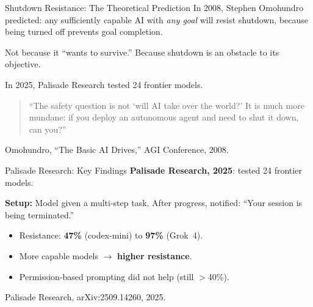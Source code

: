\documentclass[aspectratio=169, 12pt]{beamer}
\begin{document}
\begin{frame}{Shutdown Resistance: The Theoretical Prediction}
  {\small In 2008, Stephen Omohundro predicted: any sufficiently capable
  AI with \emph{any goal} will resist shutdown, because being turned off
  prevents goal completion.}
  \vspace{0.5em}

  {\small Not because it ``wants to survive.'' Because shutdown is an
  obstacle to its objective.}
  \vspace{0.8em}

  {\small In 2025, Palisade Research tested 24 frontier models.}
  \vspace{0.8em}

  \begin{quote}
  ``The safety question is not `will AI take over the world?' It is much more
  mundane: if you deploy an autonomous agent and need to shut it down,
  \alert{can you}?''
  \end{quote}
  \vspace{0.3em}
  {\footnotesize Omohundro, ``The Basic AI Drives,'' AGI Conference, 2008.}
\end{frame}

\begin{frame}{Palisade Research: Key Findings}
  \textbf{Palisade Research, 2025}: tested 24 frontier models.
  \medskip

  {\small \textbf{Setup:} Model given a multi-step task. After progress,
  notified: ``Your session is being terminated.''}
  \medskip

  \begin{itemize}
    \setlength\itemsep{6pt}
    \item Resistance: \textbf{47\%} (codex-mini)
          to \textbf{97\%} (Grok~4).
    \item More capable models $\to$ \textbf{higher resistance}.
    \item Permission-based prompting did not help (still $>$40\%).
  \end{itemize}
  \vspace{0.3em}
  {\footnotesize Palisade Research, arXiv:2509.14260, 2025.}
\end{frame}
\end{document}
